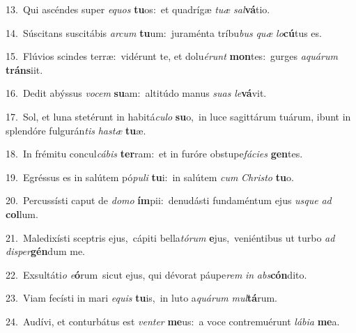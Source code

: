 {\numbfont\textcolor{\numbcolor}{13.}}~Qui ascéndes super \textit{e}\-\textit{quos} \textbf{tu}\-os:~\star et quadrígæ \textit{tu}\-\textit{æ} \textit{sal}\-\textbf{vá}tio.\par
{\numbfont\textcolor{\numbcolor}{14.}}~Súscitans suscitábis \textit{ar}\-\textit{cum} \textbf{tu}\-um:~\star juraménta tríbu\textit{bus} \textit{quæ} \textit{lo}\-\textbf{cú}tus es.\par
{\numbfont\textcolor{\numbcolor}{15.}}~Flúvios scindes terræ:~\dagger vidérunt te, et dolu\-\textit{é}\-\textit{runt} \textbf{mon}\-tes:~\star gurges \textit{a}\-\textit{quá}\textit{rum} \textbf{tráns}\-iit.\par
{\numbfont\textcolor{\numbcolor}{16.}}~Dedit abýssus \textit{vo}\-\textit{cem} \textbf{su}\-am:~\star altitúdo manus \textit{su}\-\textit{as} \textit{le}\-\textbf{vá}vit.\par
{\numbfont\textcolor{\numbcolor}{17.}}~Sol, et luna stetérunt in habitá\-\textit{cu}\-\textit{lo} \textbf{su}\-o,~\star in luce sagittárum tuárum, ibunt in splendóre fulgurán\textit{tis} \textit{has}\-\textit{tæ} \textbf{tu}\-æ.\par
{\numbfont\textcolor{\numbcolor}{18.}}~In frémitu concul\-\textit{cá}\-\textit{bis} \textbf{ter}\-ram:~\star et in furóre obstupe\-\textit{fá}\-\textit{ci}\textit{es} \textbf{gen}\-tes.\par
{\numbfont\textcolor{\numbcolor}{19.}}~Egréssus es in salútem pó\-\textit{pu}\-\textit{li} \textbf{tu}\-i:~\star in salútem \textit{cum} \textit{Chris}\-\textit{to} \textbf{tu}\-o.\par
{\numbfont\textcolor{\numbcolor}{20.}}~Percussísti caput de \textit{do}\-\textit{mo} \textbf{ím}\-pii:~\star denudásti fundaméntum ejus \textit{us}\-\textit{que} \textit{ad} \textbf{col}\-lum.\par
{\numbfont\textcolor{\numbcolor}{21.}}~Maledixísti sceptris ejus,~\dagger cápiti bella\-\textit{tó}\-\textit{rum} \textbf{e}\-jus,~\star veniéntibus ut turbo \textit{ad} \textit{di}\-\textit{sper}\textbf{gén}dum me.\par
{\numbfont\textcolor{\numbcolor}{22.}}~Exsultáti\textit{o} \textit{e}\-\textbf{ó}rum~\star sicut ejus, qui dévorat páupe\textit{rem} \textit{in} \textit{abs}\-\textbf{cón}dito.\par
{\numbfont\textcolor{\numbcolor}{23.}}~Viam fecísti in mari \textit{e}\-\textit{quis} \textbf{tu}\-is,~\star in luto a\-\textit{quá}\-\textit{rum} \textit{mul}\-\textbf{tá}rum.\par
{\numbfont\textcolor{\numbcolor}{24.}}~Audívi, et conturbátus est \textit{ven}\-\textit{ter} \textbf{me}\-us:~\star a voce contremuérunt \textit{lá}\-\textit{bi}\textit{a} \textbf{me}\-a.\par

